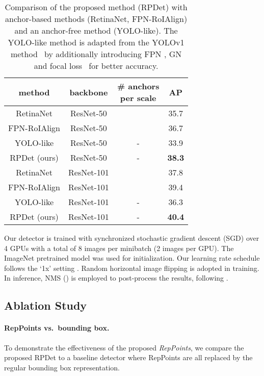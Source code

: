 \documentclass[10pt,twocolumn,letterpaper]{article}
\begin{document}
 \begin{table}[tb]
	\begin{center}
	\begin{tabular}{c|c|c|c}
	\hline
	method & backbone &\makecell{\# anchors\\per scale} & AP \\
	\hline
	\hline
	RetinaNet \cite{RetinaNet} & ResNet-50 &  & 35.7 \\
	\hline
	FPN-RoIAlign \cite{FPN} & ResNet-50 &  & 36.7 \\
	\hline
	YOLO-like & ResNet-50 & - & 33.9 \\
	\hline
	RPDet (ours) & ResNet-50 & - & \textbf{38.3} \\
	\hline
	\hline
	RetinaNet \cite{RetinaNet} & ResNet-101 &  & 37.8 \\
	\hline
	FPN-RoIAlign \cite{FPN} & ResNet-101 &  & 39.4 \\
	\hline
	YOLO-like & ResNet-101 & - & 36.3 \\
	\hline
	RPDet (ours) & ResNet-101 & - & \textbf{40.4} \\
	\hline
	\end{tabular}
	\end{center}
\caption{Comparison of the proposed method (RPDet) with anchor-based methods (RetinaNet, FPN-RoIAlign) and an anchor-free method (YOLO-like). The YOLO-like method is adapted from the YOLOv1 method~\cite{YOLO} by additionally introducing FPN \cite{FPN}, GN \cite{GN} and focal loss~\cite{RetinaNet} for better accuracy.}
\label{tab::anchors}
\end{table}

 
Our detector is trained with synchronized stochastic gradient descent (SGD) over 4 GPUs with a total of 8 images per minibatch (2 images per GPU). The ImageNet \cite{deng2009imagenet} pretrained model was used for initialization. Our learning rate schedule follows the `1x' setting \cite{Detectron2018}. Random horizontal image flipping is adopted in training. In inference, NMS () is employed to post-process the results, following \cite{RetinaNet}.

\subsection{Ablation Study}

\paragraph{RepPoints vs.~bounding box.}
To demonstrate the effectiveness of the proposed \textit{RepPoints}, we compare the proposed RPDet to a baseline detector where RepPoints are all replaced by the regular bounding box representation.
\end{document}

